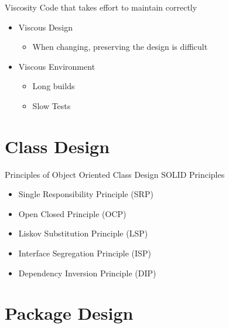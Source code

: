 \documentclass[xcolor=svgnames, handout]{beamer}
\begin{document}

\begin{frame}{Viscosity}
    Code that takes effort to maintain correctly

    \begin{itemize}
        \item<2->Viscous Design
        \begin{itemize}
            \item<4->When changing, preserving the design is difficult
        \end{itemize}
        \item<3->Viscous Environment
        \begin{itemize}
            \item<5->Long builds
            \item<6->Slow Tests
        \end{itemize}
    \end{itemize}
\end{frame}

\section{Class Design}


\begin{frame}{Principles of Object Oriented Class Design}
    SOLID Principles
    \begin{itemize}
        \item Single Responsibility Principle (SRP)
        \item Open Closed Principle (OCP)
        \item Liskov Substitution Principle (LSP)
        \item Interface Segregation Principle (ISP)
        \item Dependency Inversion Principle (DIP)
    \end{itemize}
\end{frame}


\section{Package Design}

\end{document}
